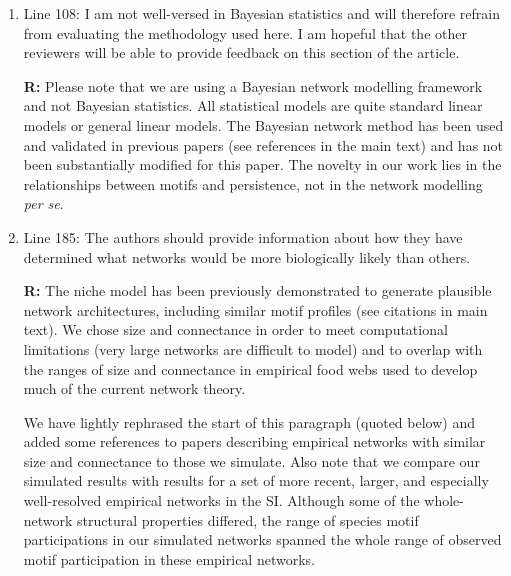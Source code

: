 \documentclass[12pt]{article}
\begin{document}
\begin{enumerate}


            \item Line 108: I am not well-versed in Bayesian statistics and will therefore refrain from evaluating the methodology used here. I am hopeful that the other reviewers will be able to provide feedback on this section of the article.

                \textbf{R:} Please note that we are using a Bayesian network modelling framework and not Bayesian statistics. All statistical models are quite standard linear models or general linear models. The Bayesian network method has been used and validated in previous papers (see references in the main text) and has not been substantially modified for this paper. The novelty in our work lies in the relationships between motifs and persistence, not in the network modelling \emph{per se}.


            \item Line 185: The authors should provide information about how they have determined what networks would be more biologically likely than others.

                \textbf{R:} The niche model has been previously demonstrated to generate plausible network architectures, including similar motif profiles (see citations in main text). We chose size and connectance in order to meet computational limitations (very large networks are difficult to model) and to overlap with the ranges of size and connectance in empirical food webs used to develop much of the current network theory. 


                We have lightly rephrased the start of this paragraph (quoted below) and added some references to papers describing empirical networks with similar size and connectance to those we simulate.
                Also note that we compare our simulated results with results for a set of more recent, larger, and especially well-resolved empirical networks in the SI. Although some of the whole-network structural properties differed, the range of species motif participations in our simulated networks spanned the whole range of observed motif participation in these empirical networks.



\end{enumerate}
\end{document}
